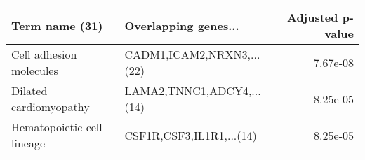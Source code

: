 \begin{tabular}{llr}
\toprule
            Term name (31) &      Overlapping genes... &  Adjusted p-value \\
\midrule
   Cell adhesion molecules & CADM1,ICAM2,NRXN3,...(22) &          7.67e-08 \\
    Dilated cardiomyopathy & LAMA2,TNNC1,ADCY4,...(14) &          8.25e-05 \\
Hematopoietic cell lineage &  CSF1R,CSF3,IL1R1,...(14) &          8.25e-05 \\
\bottomrule
\end{tabular}
